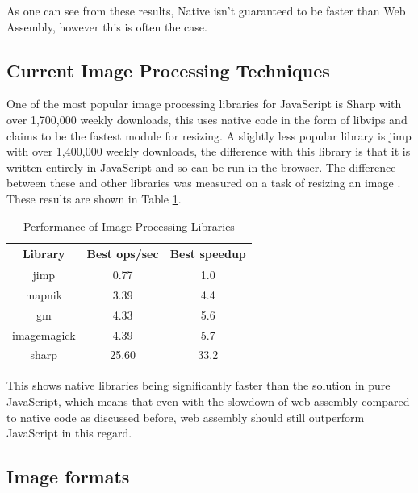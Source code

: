 \documentclass[12pt,a4paper]{article}
\begin{document}
As one can see from these results, Native isn't guaranteed to be faster than Web Assembly, however this is often the case.



\subsection{Current Image Processing Techniques}

One of the most popular image processing libraries for JavaScript is Sharp with over 1,700,000 weekly downloads, this uses native code in the form of libvips and claims to be the fastest module for resizing. A slightly less popular library is jimp with over 1,400,000 weekly downloads, the difference with this library is that it is written entirely in JavaScript and so can be run in the browser. The difference between these and other libraries was measured on a task of resizing an image \cite{sharp}. These results are shown in Table \ref{imgproc}.

\begin{table}[htb]
    \centering
    \caption{Performance of Image Processing Libraries}
    \vspace*{6pt}
    \label{imgproc}
    \begin{tabular}{ccc}\hline\hline
        Library     & Best ops/sec & Best speedup \\ \hline
        jimp        & 0.77         & 1.0          \\
        mapnik      & 3.39         & 4.4          \\
        gm          & 4.33         & 5.6          \\
        imagemagick & 4.39         & 5.7          \\
        sharp       & 25.60        & 33.2
    \end{tabular}
\end{table}


This shows native libraries being significantly faster than the solution in pure JavaScript, which means that even with the slowdown of web assembly compared to native code as discussed before, web assembly should still outperform JavaScript in this regard.

\subsection{Image formats}
\end{document}
